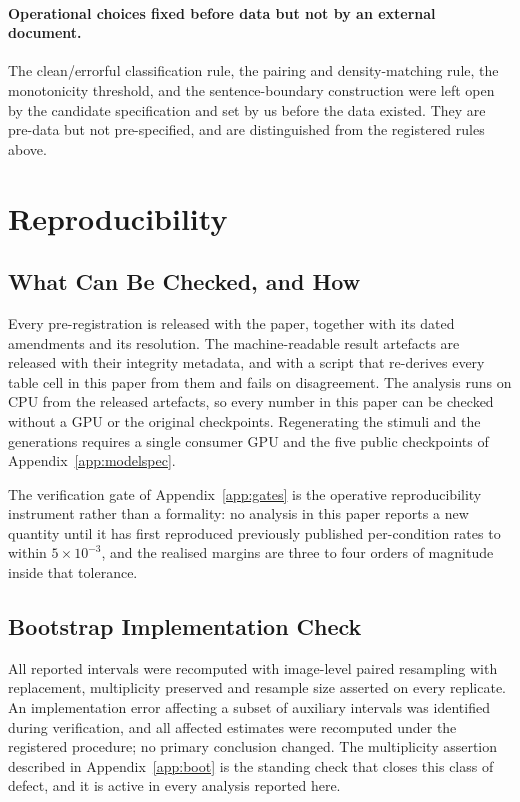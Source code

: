 \paragraph{Operational choices fixed before data but not by an external document.} The
clean/errorful classification rule, the pairing and density-matching rule, the monotonicity
threshold, and the sentence-boundary construction were left open by the candidate specification and
set by us before the data existed. They are pre-data but not pre-specified, and are distinguished
from the registered rules above.

\section{Reproducibility}
\label{app:repro}

\subsection{What Can Be Checked, and How}

Every pre-registration is released with the paper, together with its dated amendments and its
resolution. The machine-readable result artefacts are released with their integrity metadata, and
with a script that re-derives every table cell in this paper from them and fails on disagreement. The
analysis runs on CPU from the released artefacts, so every number in this paper can be
checked without a GPU or the original checkpoints. Regenerating the stimuli and the
generations requires a single consumer GPU and the five public checkpoints of
Appendix~\ref{app:modelspec}.

The verification gate of Appendix~\ref{app:gates} is the operative reproducibility instrument rather
than a formality: no analysis in this paper reports a new quantity until it has first reproduced
previously published per-condition rates to within $5\times10^{-3}$, and the realised margins are
three to four orders of magnitude inside that tolerance.

\subsection{Bootstrap Implementation Check}
\label{app:bootcheck}

All reported intervals were recomputed with image-level paired resampling with replacement,
multiplicity preserved and resample size asserted on every replicate. An implementation error
affecting a subset of auxiliary intervals was identified during verification, and all affected
estimates were recomputed under the registered procedure; no primary conclusion changed. The
multiplicity assertion described in Appendix~\ref{app:boot} is the standing check that closes this
class of defect, and it is active in every analysis reported here.

